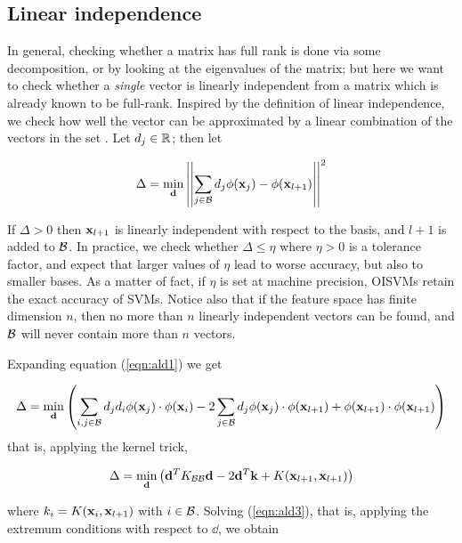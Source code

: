\subsection{Linear independence}

In general, checking whether a matrix has full rank is done via some
decomposition, or by looking at the eigenvalues of the matrix; but
here we want to check whether a \emph{single} vector is linearly
independent from a matrix which is already known to be
full-rank. Inspired by the definition of linear independence, we check
how well the vector can be approximated by a linear combination of the
vectors in the set \cite{EngelMM02sparse}. Let $d_j \in \mathbb{R}$; then let

\begin{equation} \label{eqn:ald1}
  \Delta = \min_{\mathbf{d}} \left|\left|\sum_{j \in \mathcal{B}} d_j \phi(\mathbf{x}_j) - \phi(\mathbf{x}_{l+1}) \right|\right|^2
\end{equation}

If $\Delta > 0$ then $\mathbf{x}_{l+1}$ is linearly independent with respect
to the basis, and $l+1$ is added to $\mathcal{B}$. In practice, we check
whether $\Delta \leq \eta$ where $\eta > 0$ is a tolerance factor, and
expect that larger values of $\eta$ lead to worse accuracy, but also
to smaller bases. As a matter of fact, if $\eta$ is set at machine
precision, OISVMs retain the exact accuracy of SVMs. Notice also that
if the feature space has finite dimension $n$, then no more than $n$
linearly independent vectors can be found, and $\mathcal{B}$ will never contain
more than $n$ vectors.

Expanding equation (\ref{eqn:ald1}) we get

\begin{equation} \label{eqn:ald2}
  \Delta = \min_{\mathbf{d}} \left( \sum_{i,j \in \mathcal{B}} d_j d_i \phi(\mathbf{x}_j) \cdot \phi(\mathbf{x}_i) 
    - 2\sum_{j \in \mathcal{B}} d_j \phi(\mathbf{x}_j) \cdot \phi(\mathbf{x}_{l+1})
    + \phi(\mathbf{x}_{l+1}) \cdot \phi(\mathbf{x}_{l+1}) \right)
\end{equation}
\noindent that is, applying the kernel trick,

\begin{equation} \label{eqn:ald3}
  \Delta = \min_{\mathbf{d}} \left(
      \mathbf{d}^T K_{\mathcal{B}\mathcal{B}}\mathbf{d}
    - 2 \mathbf{d}^T \mathbf{k}
    + K(\mathbf{x}_{l+1},\mathbf{x}_{l+1})
  \right)
\end{equation}

\noindent where $k_i = K(\mathbf{x}_i,\mathbf{x}_{l+1})$ with $i \in \mathcal{B}$. Solving
(\ref{eqn:ald3}), that is, applying the extremum conditions with
respect to $\dd$, we obtain


